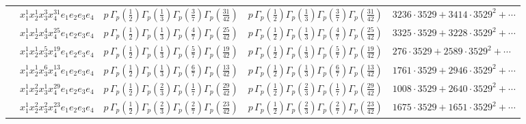 \documentclass[11pt]{article}
\begin{document}
\begin{table}[ht]
{\begin{tabular}{@{}lllll@{}}
 & $x_{1}^{1} x_{2}^{1} x_{3}^{3} x_{4}^{31}  e_{1} e_{2} e_{3} e_{4}$ & $p \, \Gamma_p \left( \frac{1}{2} \right) \Gamma_p \left( \frac{1}{3} \right) \Gamma_p \left( \frac{3}{7} \right) \Gamma_p \left( \frac{31}{42} \right)$ & $p \, \Gamma_p \left( \frac{1}{2} \right) \Gamma_p \left( \frac{1}{3} \right) \Gamma_p \left( \frac{3}{7} \right) \Gamma_p \left( \frac{31}{42} \right)$ & $3236{\cdot}3529{+}3414{\cdot}3529^{2}{+}\cdots$ \\
 & $x_{1}^{1} x_{2}^{1} x_{3}^{4} x_{4}^{25}  e_{1} e_{2} e_{3} e_{4}$ & $p \, \Gamma_p \left( \frac{1}{2} \right) \Gamma_p \left( \frac{1}{3} \right) \Gamma_p \left( \frac{4}{7} \right) \Gamma_p \left( \frac{25}{42} \right)$ & $p \, \Gamma_p \left( \frac{1}{2} \right) \Gamma_p \left( \frac{1}{3} \right) \Gamma_p \left( \frac{4}{7} \right) \Gamma_p \left( \frac{25}{42} \right)$ & $3325{\cdot}3529{+}3228{\cdot}3529^{2}{+}\cdots$ \\
 & $x_{1}^{1} x_{2}^{1} x_{3}^{5} x_{4}^{19}  e_{1} e_{2} e_{3} e_{4}$ & $p \, \Gamma_p \left( \frac{1}{2} \right) \Gamma_p \left( \frac{1}{3} \right) \Gamma_p \left( \frac{5}{7} \right) \Gamma_p \left( \frac{19}{42} \right)$ & $p \, \Gamma_p \left( \frac{1}{2} \right) \Gamma_p \left( \frac{1}{3} \right) \Gamma_p \left( \frac{5}{7} \right) \Gamma_p \left( \frac{19}{42} \right)$ & $276{\cdot}3529{+}2589{\cdot}3529^{2}{+}\cdots$ \\
 & $x_{1}^{1} x_{2}^{1} x_{3}^{6} x_{4}^{13}  e_{1} e_{2} e_{3} e_{4}$ & $p \, \Gamma_p \left( \frac{1}{2} \right) \Gamma_p \left( \frac{1}{3} \right) \Gamma_p \left( \frac{6}{7} \right) \Gamma_p \left( \frac{13}{42} \right)$ & $p \, \Gamma_p \left( \frac{1}{2} \right) \Gamma_p \left( \frac{1}{3} \right) \Gamma_p \left( \frac{6}{7} \right) \Gamma_p \left( \frac{13}{42} \right)$ & $1761{\cdot}3529{+}2946{\cdot}3529^{2}{+}\cdots$ \\
 & $x_{1}^{1} x_{2}^{2} x_{3}^{1} x_{4}^{29}  e_{1} e_{2} e_{3} e_{4}$ & $p \, \Gamma_p \left( \frac{1}{2} \right) \Gamma_p \left( \frac{2}{3} \right) \Gamma_p \left( \frac{1}{7} \right) \Gamma_p \left( \frac{29}{42} \right)$ & $p \, \Gamma_p \left( \frac{1}{2} \right) \Gamma_p \left( \frac{2}{3} \right) \Gamma_p \left( \frac{1}{7} \right) \Gamma_p \left( \frac{29}{42} \right)$ & $1008{\cdot}3529{+}2640{\cdot}3529^{2}{+}\cdots$ \\
 & $x_{1}^{1} x_{2}^{2} x_{3}^{2} x_{4}^{23}  e_{1} e_{2} e_{3} e_{4}$ & $p \, \Gamma_p \left( \frac{1}{2} \right) \Gamma_p \left( \frac{2}{3} \right) \Gamma_p \left( \frac{2}{7} \right) \Gamma_p \left( \frac{23}{42} \right)$ & $p \, \Gamma_p \left( \frac{1}{2} \right) \Gamma_p \left( \frac{2}{3} \right) \Gamma_p \left( \frac{2}{7} \right) \Gamma_p \left( \frac{23}{42} \right)$ & $1675{\cdot}3529{+}1651{\cdot}3529^{2}{+}\cdots$ \\

\end{tabular}}
\end{table}
\end{document}
